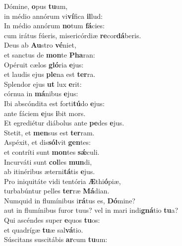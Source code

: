 \evenverse Dómine, \textbf{o}pus \textbf{tu}um,~\*\\
\evenverse in médio annórum vi\textbf{ví}fica \textbf{il}lud:\\
\oddverse In médio annórum \textbf{no}tum \textbf{fá}cies:~\*\\
\oddverse cum irátus fúeris, misericórdiæ \textbf{re}cor\textbf{dá}beris.\\
\evenverse Deus ab \textbf{Au}stro \textbf{vé}niet,~\*\\
\evenverse et sanctus de \textbf{mon}te \textbf{Pha}ran:\\
\oddverse Opéruit cælos \textbf{gló}ria \textbf{e}jus:~\*\\
\oddverse et laudis ejus \textbf{ple}na est \textbf{ter}ra.\\
\evenverse Splendor ejus \textbf{ut} lux \textbf{e}rit:~\*\\
\evenverse córnua in \textbf{má}nibus \textbf{e}jus:\\
\oddverse Ibi abscóndita est forti\textbf{tú}do \textbf{e}jus:~\*\\
\oddverse ante fáciem \textbf{e}jus \textbf{i}bit mors.\\
\evenverse Et egrediétur diábolus ante \textbf{pe}des \textbf{e}jus.~\*\\
\evenverse Stetit, et \textbf{men}sus est \textbf{ter}ram.\\
\oddverse Aspéxit, et dis\textbf{sól}vit \textbf{gen}tes:~\*\\
\oddverse et contríti sunt \textbf{mon}tes \textbf{sǽ}culi.\\
\evenverse Incurváti sunt \textbf{col}les \textbf{mun}di,~\*\\
\evenverse ab itinéribus æterni\textbf{tá}tis \textbf{e}jus.\\
\oddverse Pro iniquitáte vidi tentória \textbf{Æ}thi\textbf{ó}piæ,~\*\\
\oddverse turbabúntur pelles \textbf{ter}ræ \textbf{Má}dian.\\
\evenverse Numquid in flumínibus i\textbf{rá}tus es, \textbf{Dó}mine?~\*\\
\evenverse aut in flumínibus furor tuus? vel in mari indi\textbf{gná}tio \textbf{tu}a?\\
\oddverse Qui ascéndes super \textbf{e}quos \textbf{tu}os:~\*\\
\oddverse et quadrígæ \textbf{tu}æ sal\textbf{vá}tio.\\
\evenverse Súscitans suscitábis \textbf{ar}cum \textbf{tu}um:~\*\\
